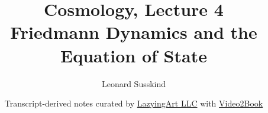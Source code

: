 \documentclass[11pt,oneside]{book}
\begin{document}
\hypersetup{pageanchor=false}
\frontmatter
\title{Cosmology, Lecture 4\\Friedmann Dynamics and the Equation of State}
\author{Leonard Susskind}
\date{Transcript-derived notes curated by \href{https://lazying.art}{LazyingArt LLC} with \href{https://github.com/lachlanchen/Video2Book}{Video2Book}}
\maketitle
\hypersetup{pageanchor=true}
\mainmatter

\end{document}
